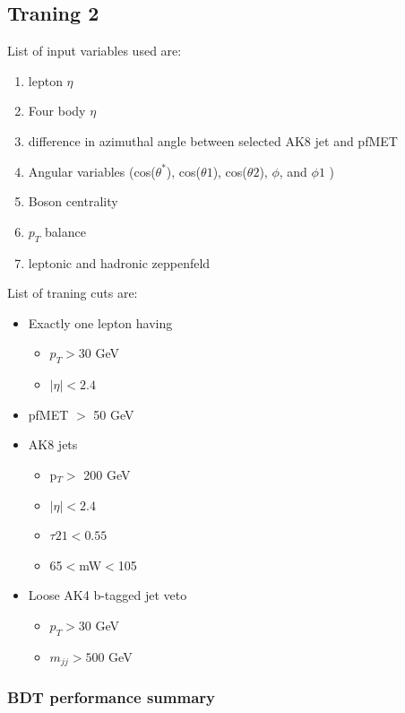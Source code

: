 \clearpage
\subsection{Traning 2}
List of input variables used are:
\begin{enumerate}
	\item lepton $\eta$
	\item Four body $\eta$
	\item difference in azimuthal angle between selected AK8 jet and pfMET
	\item Angular variables (cos($\theta^*$), cos($\theta 1$), cos($\theta 2$), $\phi$, and $\phi 1$   )
	\item Boson centrality
	\item $p_T$ balance
	\item leptonic and hadronic zeppenfeld
\end{enumerate}


List of traning cuts are:
\begin{itemize}
	\item Exactly one lepton having
	\begin{itemize}
		\item $p_T > 30$ GeV
		\item $|\eta| < 2.4$
	\end{itemize}
	\item pfMET $>$ 50 GeV
	\item AK8 jets
	\begin{itemize}
		\item  p$_T >$ 200 GeV
		\item $|\eta|<2.4$
		\item $\tau 21 < 0.55$
		\item 65$<$mW$<$105
	\end{itemize}
	\item Loose AK4 b-tagged jet veto
	\begin{itemize}
		\item $p_T>30$ GeV
		\item $m_{jj}>500$ GeV
	\end{itemize}
\end{itemize}

\subsubsection{BDT performance summary}


